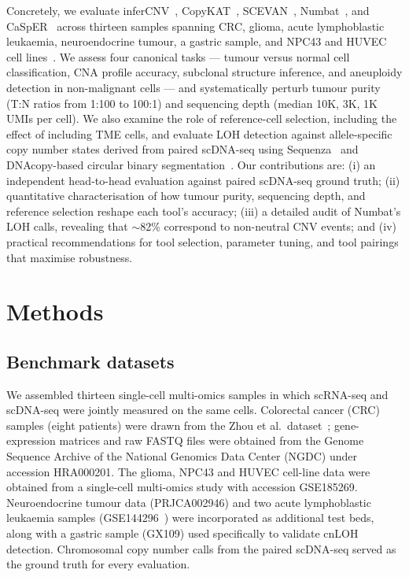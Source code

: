 \documentclass[11pt]{article}
\begin{document}
Concretely, we evaluate inferCNV~\cite{tickle2019infercnv},
CopyKAT~\cite{gao2021copykat}, SCEVAN~\cite{defalco2023scevan},
Numbat~\cite{gao2023numbat}, and CaSpER~\cite{serin2020casper} across
thirteen samples spanning CRC, glioma, acute lymphoblastic leukaemia,
neuroendocrine tumour, a gastric sample, and NPC43 and HUVEC cell
lines~\cite{zhou2020singlecell,zachariadis2020dntrseq}. We assess four
canonical tasks --- tumour versus normal cell classification, CNA profile
accuracy, subclonal structure inference, and aneuploidy detection in
non-malignant cells --- and systematically perturb tumour purity (T:N ratios
from 1:100 to 100:1) and sequencing depth (median 10K, 3K, 1K UMIs per cell).
We also examine the role of reference-cell selection, including the effect of
including TME cells, and evaluate LOH detection against allele-specific copy
number states derived from paired scDNA-seq using Sequenza~\cite{favero2015sequenza}
and DNAcopy-based circular binary segmentation~\cite{olshen2004dnacopy,
willenbrock2005comparison}. Our contributions are: (i) an independent
head-to-head evaluation against paired scDNA-seq ground truth; (ii)
quantitative characterisation of how tumour purity, sequencing depth, and
reference selection reshape each tool's accuracy; (iii) a detailed audit of
Numbat's LOH calls, revealing that $\sim$82\% correspond to non-neutral CNV
events; and (iv) practical recommendations for tool selection, parameter
tuning, and tool pairings that maximise robustness.

\section{Methods}

\subsection{Benchmark datasets}

We assembled thirteen single-cell multi-omics samples in which scRNA-seq and
scDNA-seq were jointly measured on the same cells. Colorectal cancer (CRC)
samples (eight patients) were drawn from the Zhou et al.\
dataset~\cite{zhou2020singlecell}; gene-expression matrices and raw FASTQ
files were obtained from the Genome Sequence Archive of the National
Genomics Data Center (NGDC) under accession HRA000201. The glioma, NPC43 and
HUVEC cell-line data were obtained from a single-cell multi-omics study with
accession GSE185269. Neuroendocrine tumour data (PRJCA002946) and two acute
lymphoblastic leukaemia samples (GSE144296~\cite{zachariadis2020dntrseq})
were incorporated as additional test beds, along with a gastric sample
(GX109) used specifically to validate cnLOH detection. Chromosomal copy
number calls from the paired scDNA-seq served as the ground truth for every
evaluation.
\end{document}
